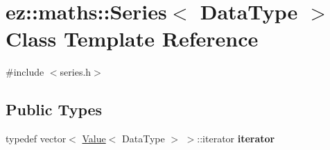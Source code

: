 \hypertarget{classez_1_1maths_1_1Series}{}\section{ez\+:\+:maths\+:\+:Series$<$ Data\+Type $>$ Class Template Reference}
\label{classez_1_1maths_1_1Series}


{\ttfamily \#include $<$series.\+h$>$}

\subsection*{Public Types}
\begin{DoxyCompactItemize}
\item 
\mbox{\label{classez_1_1maths_1_1Series_a0c38091ad519ac987e0a530ac6772225}} 
typedef vector$<$ \hyperlink{classez_1_1maths_1_1Value}{Value}$<$ Data\+Type $>$ $>$\+::iterator {\bfseries iterator}
\end{DoxyCompactItemize}
